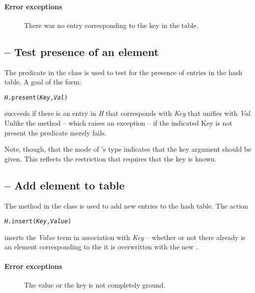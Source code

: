 \paragraph{Error exceptions}
\begin{description}
\item[]
There was no entry corresponding to the key in the table.
\end{description}

\subsection{ -- Test presence of an element}
\label{hash:present}

The  predicate in the  class is used to test for the presence of entries in the hash table. A goal of the form:
\begin{alltt}
\emph{H}.present(\emph{Key},\emph{Val})
\end{alltt}
succeeds if there is an entry in \emph{H} that corresponds with \emph{Key} that unifies with \emph{Val}. Unlike the  method -- which raises an exception -- if the indicated Key is not present the predicate merely fails.

Note, though, that the mode of 's type indicates that the key argument should be given. This reflects the restriction that  requires that the key is known.

\subsection{ -- Add element to table}
\label{hash:insert}
The  method in the  class is used to add new entries to the hash table.
The action
\begin{alltt}
\emph{H}.insert(\emph{Key},\emph{Value})
\end{alltt}
inserts the \emph{Value} term in association with \emph{Key} -- whether or not there already is an element corresponding to the  it is overwritten with the new .

\paragraph{Error exceptions}
\begin{description}
\item[]
The value or the key is not completely ground.
\end{description}


